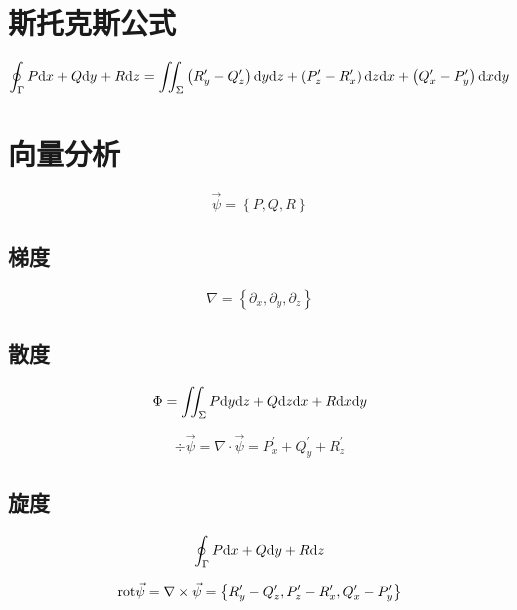 \documentclass{article}
\begin{document}
\section{斯托克斯公式}

\[\oint_\Gamma P\mathrm d x+Q\mathrm d y+R\mathrm d z=\iint_\Sigma
    \left(R_y^\prime-Q_z^\prime\right)\mathrm d y\mathrm d z+
    \left(P_z^\prime-R_x^\prime\right)\mathrm d z\mathrm d x+
    \left(Q_x^\prime-P_y^\prime\right)\mathrm d x\mathrm d y\]

\section{向量分析}

\begin{definition}[向量场]
    \[\vec\psi=\left\{P,Q,R\right\}\]
\end{definition}

\subsection{梯度}

\begin{definition}[梯度]
    \[\nabla=\left\{\partial_x,\partial_y,\partial_z\right\}\]
\end{definition}

\subsection{散度}

\begin{definition}
    \[\Phi=\iint_\Sigma P\mathrm d y\mathrm d z+Q\mathrm d z\mathrm d x+R\mathrm d x\mathrm d y\]
\end{definition}

\begin{theorem}[散度]
    \[\div\vec\psi=
        \nabla\cdot\vec \psi=
        P_x^\prime+Q_y^\prime+R_z^\prime\]
\end{theorem}

\subsection{旋度}

\begin{definition}
    \[\oint_\Gamma P\mathrm d x+Q\mathrm d y+R \mathrm d z\]
\end{definition}

\begin{theorem}[旋度]
    \[\mathrm{rot}\vec\psi=
        \nabla\times\vec\psi=\left\{
        R_y^\prime-Q_z^\prime,
        P_z^\prime-R_x^\prime,
        Q_x^\prime-P_y^\prime
        \right\}\]
\end{theorem}
\end{document}
